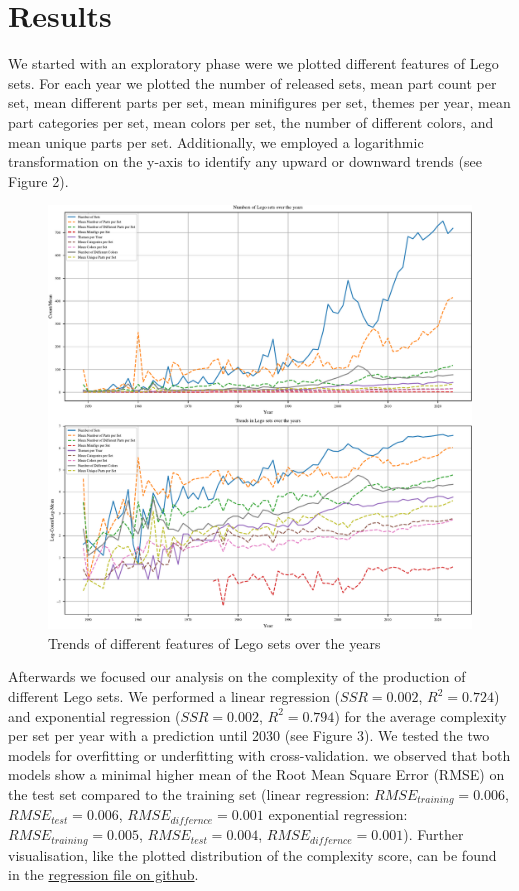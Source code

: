 \documentclass{article}
\theoremstyle{plain}
\theoremstyle{definition}
\theoremstyle{remark}
\begin{document}
\section{Results}\label{sec:results}
We started with an exploratory phase were we plotted different features of Lego sets. For each year we plotted the number of released sets, mean part count per set, mean different parts per set, mean minifigures per set, themes per year, mean part categories per set, mean colors per set, the number of different colors, and mean unique parts per set. Additionally, we employed a logarithmic transformation on the y-axis to identify any  upward or downward trends (see Figure 2).

\begin{figure}[ht]
 \vskip 0.2in
 \begin{center}
 \centerline{\includegraphics[width=\columnwidth]{Images/Exploration.pdf}}
\caption{Trends of different features of Lego sets over the years}
\label{icml-historical}
 \end{center}
 \vskip -0.2in
\end{figure}

Afterwards we focused our analysis on the complexity of the production of different Lego sets. We performed a linear regression ($SSR = 0.002$, $R^2= 0.724$) and exponential regression ($SSR = 0.002$, $R^2= 0.794$) for the average complexity per set per year with a prediction until 2030 (see Figure 3). We tested the two models for overfitting or underfitting with cross-validation. we observed that both models show a minimal higher mean of the Root Mean Square Error (RMSE) on the test set compared to the training set (linear regression: $RMSE_{training} = 0.006$, $RMSE_{test} = 0.006$, $RMSE_{differnce} = 0.001$ exponential regression: $RMSE_{training} = 0.005$, $RMSE_{test} = 0.004$, $RMSE_{differnce} = 0.001$). Further visualisation, like the plotted distribution of the complexity score, can be found in the \href{https://github.com/eddiebeach99/Data_Literacy/blob/main/Analysis/complexity_regression.ipynb}{regression file on github}.
\end{document}

